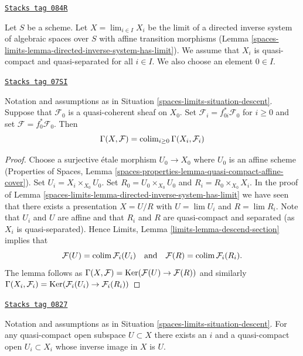 \begin{definition}
\label{spaces-limits-situation-descent}
\href{https://stacks.math.columbia.edu/tag/084R}{\texttt{Stacks tag 084R}}

Let $S$ be a scheme. Let $X = \lim_{i \in I} X_i$ be the limit of a directed
inverse system of algebraic spaces over $S$ with affine transition morphisms
(Lemma \ref{spaces-limits-lemma-directed-inverse-system-has-limit}).
We assume that $X_i$ is quasi-compact and quasi-separated for all $i \in I$.
We also choose an element $0 \in I$.
\end{definition}

\begin{lemma}
\label{spaces-limits-lemma-descend-section}
\href{https://stacks.math.columbia.edu/tag/07SI}{\texttt{Stacks tag 07SI}}

Notation and assumptions as in Situation \ref{spaces-limits-situation-descent}.
Suppose that $\mathcal{F}_0$ is a quasi-coherent sheaf on $X_0$.
Set $\mathcal{F}_i = f_{0i}^*\mathcal{F}_0$ for $i \geq 0$ and set
$\mathcal{F} = f_0^*\mathcal{F}_0$. Then
$$
\Gamma(X, \mathcal{F}) = \operatorname{colim}_{i \geq 0} \Gamma(X_i, \mathcal{F}_i)
$$
\end{lemma}

\begin{proof}
Choose a surjective \'etale morphism $U_0 \to X_0$ where $U_0$ is an affine
scheme (Properties of Spaces, Lemma
\ref{spaces-properties-lemma-quasi-compact-affine-cover}).
Set $U_i = X_i \times_{X_0} U_0$.
Set $R_0 = U_0 \times_{X_0} U_0$ and $R_i = R_0 \times_{X_0} X_i$.
In the proof of Lemma \ref{spaces-limits-lemma-directed-inverse-system-has-limit} we have
seen that there exists a presentation $X = U/R$ with
$U = \lim U_i$ and $R = \lim R_i$.
Note that $U_i$ and $U$ are affine and that $R_i$ and $R$ are
quasi-compact and separated (as $X_i$ is quasi-separated). Hence
Limits, Lemma \ref{limits-lemma-descend-section}
implies that
$$
\mathcal{F}(U) = \operatorname{colim} \mathcal{F}_i(U_i)
\quad\text{and}\quad
\mathcal{F}(R) = \operatorname{colim} \mathcal{F}_i(R_i).
$$
The lemma follows as
$\Gamma(X, \mathcal{F}) = \operatorname{Ker}(\mathcal{F}(U) \to \mathcal{F}(R))$
and similarly
$\Gamma(X_i, \mathcal{F}_i) =
\operatorname{Ker}(\mathcal{F}_i(U_i) \to \mathcal{F}_i(R_i))$
\end{proof}

\begin{lemma}
\label{spaces-limits-lemma-descend-opens}
\href{https://stacks.math.columbia.edu/tag/0827}{\texttt{Stacks tag 0827}}

Notation and assumptions as in Situation \ref{spaces-limits-situation-descent}.
For any quasi-compact open subspace $U \subset X$ there exists an $i$
and a quasi-compact open $U_i \subset X_i$ whose inverse image in $X$ is $U$.
\end{lemma}


